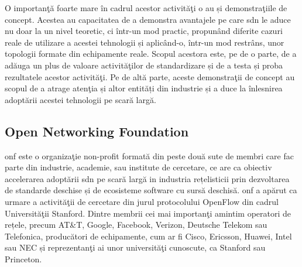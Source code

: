 O importanţă foarte mare în cadrul acestor activităţi o au și demonstraţiile de concept. Acestea au capacitatea de a demonstra avantajele pe care \gls{sdn} le aduce nu doar la un nivel teoretic, ci într-un mod practic, propunând diferite cazuri reale de utilizare a acestei tehnologii și aplicând-o, într-un mod restrâns, unor topologii formate din echipamente reale. Scopul acestora este, pe de o parte, de a adăuga un plus de valoare activităţilor de standardizare și de a testa și proba rezultatele acestor activităţi. Pe de altă parte, aceste demonstraţii de concept au scopul de a atrage atenţia și altor entități din industrie și a duce la înlesnirea adoptării acestei tehnologii pe scară largă.

\subsection{Open Networking Foundation}

\gls{onf} este o organizaţie non-profit formată din peste două sute de membri care fac parte din industrie, academie, sau institute de cercetare, ce are ca obiectiv accelerarea adoptării \gls{sdn} pe scară largă in industria rețelisticii prin dezvoltarea de standarde deschise și de ecosisteme software cu sursă deschisă. \gls{onf} a apărut ca urmare a activităţii de cercetare din jurul protocolului OpenFlow din cadrul Universităţii Stanford. Dintre membrii cei mai importanţi amintim operatori de rețele, precum AT\&T, Google, Facebook, Verizon, Deutsche Telekom sau Telefonica, producători de echipamente, cum ar fi Cisco, Ericsson, Huawei, Intel sau NEC și reprezentanţi ai unor universităţi cunoscute, ca Stanford sau Princeton.

